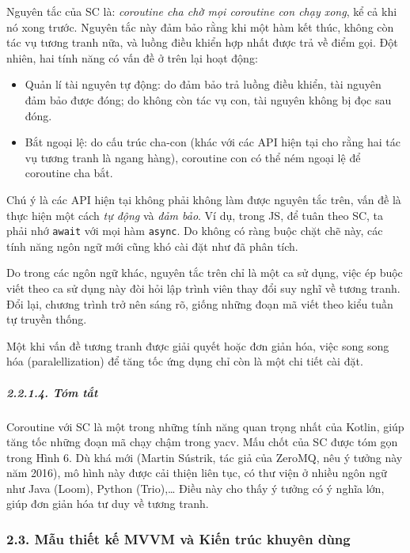 \documentclass[
]{article}
\begin{document}
Nguyên tắc của SC là: \emph{coroutine cha chờ mọi coroutine con chạy
xong}, kể cả khi nó xong trước. Nguyên tắc này đảm bảo rằng khi một hàm
kết thúc, không còn tác vụ tương tranh nữa, và luồng điều khiển hợp nhất
được trả về điểm gọi. Đột nhiên, hai tính năng có vấn đề ở trên lại hoạt
động:

\begin{itemize}
\item
  Quản lí tài nguyên tự động: do đảm bảo trả luồng điều khiển, tài
  nguyên đảm bảo được đóng; do không còn tác vụ con, tài nguyên không bị
  đọc sau đóng.
\item
  Bắt ngoại lệ: do cấu trúc cha-con (khác với các API hiện tại cho rằng
  hai tác vụ tương tranh là ngang hàng), coroutine con có thể ném ngoại
  lệ để coroutine cha bắt.
\end{itemize}

Chú ý là các API hiện tại không phải không làm được nguyên tắc trên, vấn
đề là thực hiện một cách \emph{tự động} và \emph{đảm bảo}. Ví dụ, trong
JS, để tuân theo SC, ta phải nhớ \texttt{await} với mọi hàm
\texttt{async}. Do không có ràng buộc chặt chẽ này, các tính năng ngôn
ngữ mới cũng khó cài đặt như đã phân tích.

Do trong các ngôn ngữ khác, nguyên tắc trên chỉ là một ca sử dụng, việc
ép buộc viết theo ca sử dụng này đòi hỏi lập trình viên thay đổi suy
nghĩ về tương tranh. Đổi lại, chương trình trở nên sáng rõ, giống những
đoạn mã viết theo kiểu tuần tự truyền thống.

Một khi vấn đề tương tranh được giải quyết hoặc đơn giản hóa, việc song
song hóa (paralellization) để tăng tốc ứng dụng chỉ còn là một chi tiết
cài đặt.

\hypertarget{tuxf3m-tux1eaft}{%
\subparagraph{2.2.1.4. Tóm tắt}\label{tuxf3m-tux1eaft}}

Coroutine với SC là một trong những tính năng quan trọng nhất của
Kotlin, giúp tăng tốc những đoạn mã chạy chậm trong yacv. Mấu chốt của
SC được tóm gọn trong Hình 6. Dù khá mới (Martin Sústrik, tác giả của
ZeroMQ, nêu ý tưởng này năm 2016), mô hình này được cải thiện liên tục,
có thư viện ở nhiều ngôn ngữ như Java (Loom), Python (Trio),\ldots{}
Điều này cho thấy ý tưởng có ý nghĩa lớn, giúp đơn giản hóa tư duy về
tương tranh.

\hypertarget{mux1eabu-thiux1ebft-kux1ebf-mvvm-vuxe0-kiux1ebfn-truxfac-khuyuxean-duxf9ng}{%
\subsubsection{\texorpdfstring{2.3. Mẫu thiết kế MVVM và Kiến trúc
khuyên dùng
}{2.3. Mẫu thiết kế MVVM và Kiến trúc khuyên dùng }}\label{mux1eabu-thiux1ebft-kux1ebf-mvvm-vuxe0-kiux1ebfn-truxfac-khuyuxean-duxf9ng}}
\end{document}

